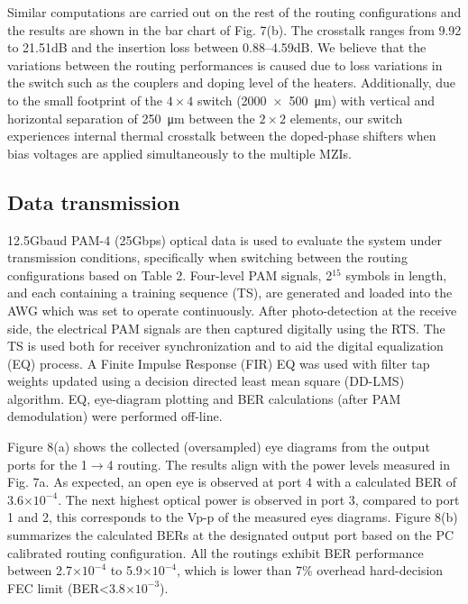 Similar computations are carried out on the rest of the routing configurations and the results are shown in the bar chart of Fig. 7(b). The crosstalk ranges from 9.92 to 21.51dB and the insertion loss between 0.88--4.59dB. We believe that the variations between the routing performances is caused due to loss variations in the switch such as the couplers and doping level of the heaters. Additionally, due to the small footprint of the $4\times4$ switch (\SI{2000x500 }{\micro\metre}) with vertical and horizontal separation of \SI{250}{\micro\metre} between the $2\times2$ elements, our switch experiences internal thermal crosstalk between the doped-phase shifters when bias voltages are applied simultaneously to the multiple MZIs. 

\subsection{Data transmission}

12.5Gbaud PAM-4 (25Gbps) optical data is used to evaluate the system under transmission conditions, specifically when switching between the routing configurations based on Table 2. Four-level PAM signals, 2$^{15}$ symbols in length, and each containing a training sequence (TS), are generated and loaded into the AWG which was set to operate continuously. After photo-detection at the receive side, the electrical PAM signals are then captured digitally using the RTS. The TS is used both for receiver synchronization and to aid the digital equalization (EQ) process. A Finite Impulse Response (FIR) EQ was used with filter tap weights updated using a decision directed least mean square (DD-LMS) algorithm. EQ, eye-diagram plotting and BER calculations (after PAM demodulation) were performed off-line.

Figure 8(a) shows the collected (oversampled) eye diagrams from the output ports for the 1$\rightarrow$4 routing. The results align with the power levels measured in Fig. 7a. As expected, an open eye is observed at port 4 with a calculated BER of 3.6$\times 10^{-4}$. The next highest optical power is observed in port 3, compared to port 1 and 2, this corresponds to the V{\scriptsize{p-p}} of the measured eyes diagrams. Figure 8(b) summarizes the calculated BERs at the designated output port based on the PC calibrated routing configuration. All the routings exhibit BER performance between 2.7$\times 10^{-4}$ to 5.9$\times 10^{-4}$, which is lower than 7\% overhead hard-decision FEC limit (BER<3.8$\times 10^{-3}$).

